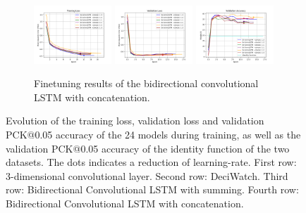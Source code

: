 \documentclass[./main.tex]{subfiles}
\begin{document}
\begin{figure}[htbp]
    \begin{subfigure}[b]{\textwidth}
        \centering
        \includegraphics[width=0.32\textwidth]{./entities/finetuned/unipose2/train_losses.png}
        \includegraphics[width=0.32\textwidth]{./entities/finetuned/unipose2/val_losses.png}
        \includegraphics[width=0.32\textwidth]{./entities/finetuned/unipose2/val_accs.png}
        \caption{Finetuning results of the bidirectional convolutional LSTM with concatenation.}
    \end{subfigure}
    \hfill
    
    \caption{Evolution of the training loss, validation loss and validation PCK@0.05 accuracy of the 24 models during training, as well as the validation PCK@0.05 accuracy of the identity function of the two datasets. The dots indicates a reduction of learning-rate. First row: 3-dimensional convolutional layer. Second row: DeciWatch. Third row: Bidirectional Convolutional LSTM with summing. Fourth row: Bidirectional Convolutional LSTM with concatenation.}
    \label{fig:finetune_res}
\end{figure}
\end{document}
